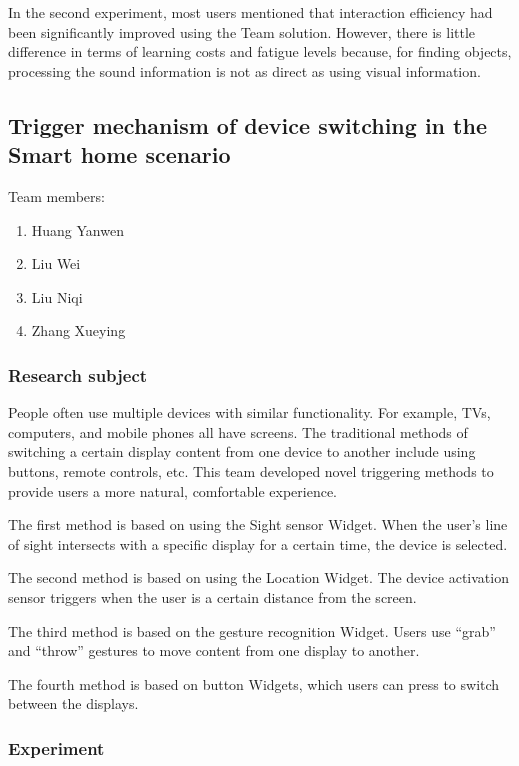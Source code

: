 In the second experiment, most users mentioned that interaction efficiency had been significantly improved using the Team solution. However, there is little difference in terms of learning costs and fatigue levels because, for finding objects, processing the sound information is not as direct as using visual information. 

\subsection{Trigger mechanism of device switching in the Smart home scenario}

Team members:
\begin{enumerate}
    \item Huang Yanwen 
    \item Liu Wei 
    \item Liu Niqi 
    \item Zhang Xueying 
\end{enumerate}

\subsubsection{Research subject}

People often use multiple devices with similar functionality. For example, TVs, computers, and mobile phones all have screens. The traditional methods of switching a certain display content from one device to another include using buttons, remote controls, etc. This team developed novel triggering methods to provide users a more natural, comfortable experience.

The first method is based on using the Sight sensor Widget. When the user's line of sight intersects with a specific display for a certain time, the device is selected.

The second method is based on using the Location Widget. The device activation sensor triggers when the user is a certain distance from the screen.

The third method is based on the gesture recognition Widget. Users use ``grab'' and ``throw'' gestures to move content from one display to another.
 
The fourth method is based on button Widgets, which users can press to switch between the displays.

\subsubsection{Experiment}

